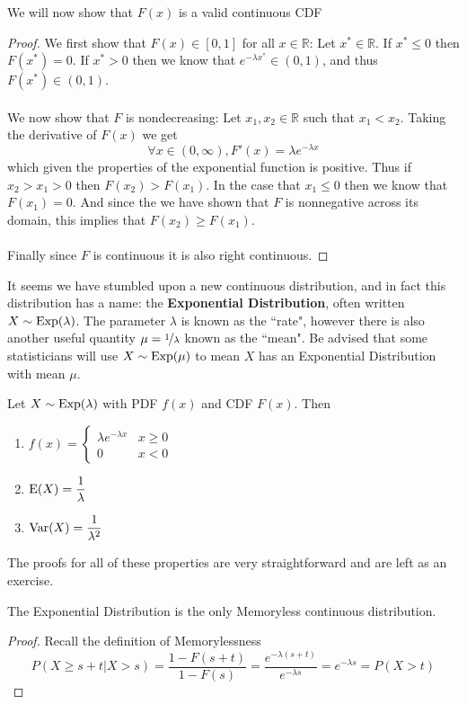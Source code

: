 \documentclass{report}
\begin{document}
We will now show that $F(x)$ is a valid continuous CDF
\begin{proof}
    We first show that $F(x)\in[0,1]$ for all $x\in\mathbb R$: Let $x^*\in\mathbb R$. If $x^*\le 0$ then $F(x^*)=0$. If $x^*> 0$ then we know that $e^{-\lambda x^*}\in (0,1)$, and thus $F(x^*)\in (0,1)$. 
    \\\\
    We now show that $F$ is nondecreasing: Let $x_1,x_2\in\mathbb R$ such that $x_1<x_2$. Taking the derivative of $F(x)$ we get
    \[
        \forall x\in(0,\infty), F'(x)=\lambda e^{-\lambda x}
    \]
    which given the properties of the exponential function is positive. Thus if $x_2>x_1>0$ then $F(x_2)>F(x_1)$. In the case that $x_1\le 0$ then we know that $F(x_1)=0$. And since the we have shown that $F$ is nonnegative across its domain, this implies that $F(x_2)\ge F(x_1)$.
    \\\\
    Finally since $F$ is continuous it is also right continuous.     
\end{proof}

It seems we have stumbled upon a new continuous distribution, and in fact this distribution has a name: the \textbf{Exponential Distribution}, often written $X\sim\textup{Exp}(\lambda)$. The parameter $\lambda$ is known as the ``rate", however there is also another useful quantity $\mu=\nicefrac 1 \lambda$ known as the ``mean". Be advised that some statisticians will use $X\sim\textup{Exp}(\mu)$ to mean $X$ has an Exponential Distribution with mean $\mu$.
\begin{theorem}
    Let $X\sim\textup{Exp}(\lambda)$ with PDF $f(x)$ and CDF $F(x)$. Then
    \begin{enumerate}
        \item $f(x)=\begin{cases}
        \lambda e^{-\lambda x} & x \ge 0
        \\
        0 & x < 0
        \end{cases}$
        \item $\textup{E}(X)=\displaystyle\frac 1 \lambda$
        \item $\textup{Var}(X)=\displaystyle\frac 1 {\lambda^2}$
    \end{enumerate}
    The proofs for all of these properties are very straightforward and are left as an exercise.
\end{theorem}

\begin{theorem}
    The Exponential Distribution is the only Memoryless continuous distribution.
    \begin{proof}
        Recall the definition of Memorylessness
        \[
            P(X\ge s+t| X>s)=\frac{1-F(s+t)}{1-F(s)}
            =\frac{e^{-\lambda (s+t)}}{e^{-\lambda s}}
            =e^{-\lambda s}
            =P(X>t)
        \]
        \todo
    \end{proof}
\end{theorem}
\end{document}
